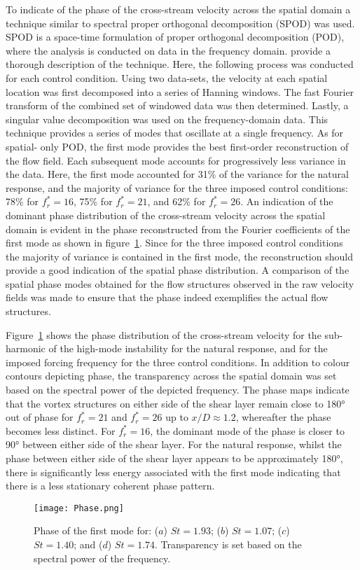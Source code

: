 \documentclass[3p]{elsarticle}
\newcommand{\freqrat}{\ensuremath{f_r^*}}
\begin{document}
To indicate of the phase of the cross-stream velocity
across the spatial domain a technique similar to spectral proper orthogonal decomposition (SPOD) was used. SPOD is a space-time formulation of proper
orthogonal decomposition (POD), where the analysis is conducted on
data in the frequency domain. \citet{Towne2018} provide a thorough
description of the technique. Here, the following process was conducted for each control condition. Using two data-sets, the velocity at each spatial location was first decomposed into a series of Hanning windows. The fast Fourier transform of the combined set of windowed data was then determined. Lastly, a singular value
decomposition was used on the frequency-domain data. This technique provides a
series of modes that oscillate at a single frequency. As for spatial-
only POD, the first mode provides the best first-order
reconstruction of the flow field. Each subsequent mode accounts for
progressively less variance in the data. Here, the first mode
accounted for 31\% of the variance for the natural response, and the majority of variance for the three imposed control conditions: 78\% for $\freqrat=16$,
75\% for $\freqrat=21$, and 62\% for $\freqrat=26$. An indication of the dominant phase distribution of the cross-stream velocity across the spatial domain is evident in the phase reconstructed from the Fourier coefficients of the first mode as shown in figure~\ref{fig:phase}. Since for the three imposed control conditions the majority of variance is contained in the first mode, the reconstruction should provide a good indication of the spatial phase distribution. A comparison of the spatial phase modes obtained for the flow structures observed in the raw velocity fields was made to ensure
that the phase indeed exemplifies the actual flow structures.

Figure~\ref{fig:phase} shows the phase distribution of the cross-stream velocity for the sub-harmonic
of the high-mode instability for the natural response, and for the
imposed forcing frequency for the three control conditions. In addition to
colour contours depicting phase, the
transparency across the spatial domain was set based on the spectral
power of the depicted frequency. The phase maps indicate that the vortex
structures on either side of the shear layer remain close to \ang{180} out of phase for $\freqrat=21$ and
$\freqrat=26$ up to $x/D\approx1.2$, whereafter the phase becomes less
distinct. For $\freqrat=16$, the dominant mode of the phase is closer
to \ang{90} between either side of the shear layer. For
the natural response, whilst the phase between either side of the shear layer appears to be approximately \ang{180}, there is significantly less energy associated with the first mode indicating that there is a less stationary
coherent phase pattern.
%
\begin{figure}
	\centering
	\texttt{[image: Phase.png]} %
	\caption{Phase of the first mode for: ($a$)
		$St=1.93$; ($b$) $St=1.07$;
		($c$) $St=1.40$; and ($d$)
		$St=1.74$. Transparency is set based on the spectral power of the frequency.}
	\label{fig:phase}
\end{figure}
%
\end{document}
